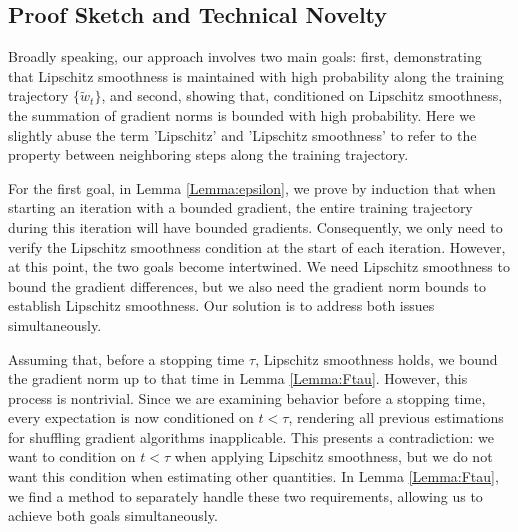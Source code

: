 \documentclass{article} %
\theoremstyle{plain}
\theoremstyle{definition}
\theoremstyle{remark}
\begin{document}
\subsection{Proof Sketch and Technical Novelty}

Broadly speaking, our approach involves two main goals: first, demonstrating that Lipschitz smoothness is maintained with high probability along the training trajectory $\{\tilde{w}_t\}$, and second, showing that, conditioned on Lipschitz smoothness, the summation of gradient norms is bounded with high probability. Here we slightly abuse the term 'Lipschitz' and 'Lipschitz smoothness' to refer to the property between neighboring steps along the training trajectory.

For the first goal, in Lemma \ref{Lemma:epsilon}, we prove by induction that when starting an iteration with a bounded gradient, the entire training trajectory during this iteration will have bounded gradients. Consequently, we only need to verify the Lipschitz smoothness condition at the start of each iteration. However, at this point, the two goals become intertwined. We need Lipschitz smoothness to bound the gradient differences, but we also need the gradient norm bounds to establish Lipschitz smoothness. Our solution is to address both issues simultaneously.

Assuming that, before a stopping time $\tau$, Lipschitz smoothness holds, we bound the gradient norm up to that time in Lemma \ref{Lemma:Ftau}. However, this process is nontrivial. Since we are examining behavior before a stopping time, every expectation is now conditioned on $t < \tau$, rendering all previous estimations for shuffling gradient algorithms inapplicable. This presents a contradiction: we want to condition on $t < \tau$ when applying Lipschitz smoothness, but we do not want this condition when estimating other quantities. In Lemma \ref{Lemma:Ftau}, we find a method to separately handle these two requirements, allowing us to achieve both goals simultaneously.


\end{document}
